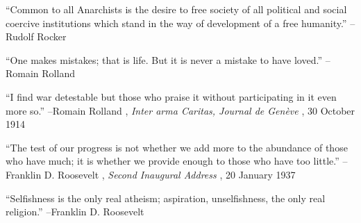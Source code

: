 \documentclass{article}%
\begin{document}
\begin{minipage}{\textwidth}%
\flushleft%
“Common to all Anarchists is the desire to free society of all political and social coercive institutions which stand in the way of development of a free humanity.”%
\linebreak%
\vspace{1mm}%
–Rudolf Rocker%
\linebreak%
\vspace{1mm}%
\end{minipage}%
\linebreak%
\vspace{1mm}%
\begin{minipage}{\textwidth}%
\flushleft%
“One makes mistakes; that is life. But it is never a mistake to have loved.”%
\linebreak%
\vspace{1mm}%
–Romain Rolland%
\linebreak%
\vspace{1mm}%
\end{minipage}%
\linebreak%
\vspace{1mm}%
\begin{minipage}{\textwidth}%
\flushleft%
“I find war detestable but those who praise it without participating in it even more so.”%
\linebreak%
\vspace{1mm}%
–Romain Rolland%
, \textit{Inter arma Caritas, Journal de Genève}%
, 30 October 1914%
\linebreak%
\vspace{1mm}%
\end{minipage}%
\linebreak%
\vspace{1mm}%
\begin{minipage}{\textwidth}%
\flushleft%
“The test of our progress is not whether we add more to the abundance of those who have much; it is whether we provide enough to those who have too little.”%
\linebreak%
\vspace{1mm}%
–Franklin D. Roosevelt%
, \textit{Second Inaugural Address}%
, 20 January 1937%
\linebreak%
\vspace{1mm}%
\end{minipage}%
\linebreak%
\vspace{1mm}%
\begin{minipage}{\textwidth}%
\flushleft%
“Selfishness is the only real atheism; aspiration, unselfishness, the only real religion.”%
\linebreak%
\vspace{1mm}%
–Franklin D. Roosevelt%
\linebreak%
\vspace{1mm}%
\end{minipage}%
\end{document}
